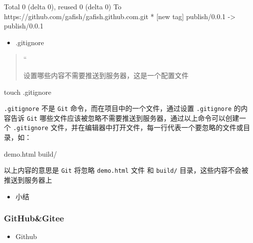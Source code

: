 \documentclass[
]{article}
\newenvironment{Shaded}{}{}
\newcommand{\NormalTok}[1]{#1}
\begin{document}
\begin{Shaded}
\begin{Highlighting}[]
\NormalTok{Total 0 (delta 0), reused 0 (delta 0)}
\NormalTok{To https://github.com/gafish/gafish.github.com.git}
\NormalTok{ * [new tag]         publish/0.0.1 {-}\textgreater{} publish/0.0.1}
\end{Highlighting}
\end{Shaded}

\begin{itemize}
\item
  .gitignore
\end{itemize}

\begin{quote}
``

设置哪些内容不需要推送到服务器，这是一个配置文件
\end{quote}

\begin{Shaded}
\begin{Highlighting}[]
\NormalTok{touch .gitignore}
\end{Highlighting}
\end{Shaded}

\texttt{.gitignore} 不是 \texttt{Git}
命令，而在项目中的一个文件，通过设置 \texttt{.gitignore} 的内容告诉
\texttt{Git}
哪些文件应该被忽略不需要推送到服务器，通过以上命令可以创建一个
\texttt{.gitignore}
文件，并在编辑器中打开文件，每一行代表一个要忽略的文件或目录，如：

\begin{Shaded}
\begin{Highlighting}[]
\NormalTok{demo.html}
\NormalTok{build/}
\end{Highlighting}
\end{Shaded}

以上内容的意思是 \texttt{Git} 将忽略 \texttt{demo.html} 文件 和
\texttt{build/} 目录，这些内容不会被推送到服务器上

\begin{itemize}
\item
  小结
\end{itemize}

\hypertarget{githubgitee}{%
\subsubsection{GitHub\&Gitee}\label{githubgitee}}

\begin{itemize}
\item
  Github
\end{itemize}
\end{document}
